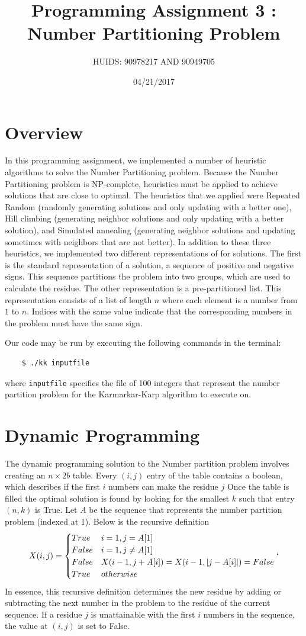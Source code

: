 \documentclass[a4paper]{article}
\title{Programming Assignment 3 : Number Partitioning Problem}
\author{HUIDS: 90978217 AND 90949705}
\date{04/21/2017}
\begin{document}
	
	\maketitle
	
	\section{Overview}
	In this programming assignment, we implemented a number of heuristic algorithms to solve the Number Partitioning problem. Because the Number Partitioning problem is NP-complete, heuristics must be applied to achieve solutions that are close to optimal. The heuristics that we applied were Repeated Random (randomly generating solutions and only updating with a better one), Hill climbing (generating neighbor solutions and only updating with a better solution), and Simulated annealing (generating neighbor solutions and updating sometimes with neighbors that are not better). In addition to these three heuristics, we implemented two different representations of for solutions. The first is the standard representation of a solution, a sequence of positive and negative signs. This sequence partitions the problem into two groups, which are used to calculate the residue. The other representation is a pre-partitioned list. This representation consists of a list of length $n$ where each element is a number from $1$ to $n$. Indices with the same value indicate that the corresponding numbers in the problem must have the same sign.
	
	Our code may be run by executing the following commands in the terminal:
	\begin{verbatim}
	$ ./kk inputfile
	\end{verbatim}
	where \texttt{inputfile} specifies the file of 100 integers that represent the number partition problem for the Karmarkar-Karp algorithm to execute on.
	
	\section{Dynamic Programming}
	The dynamic programming solution to the Number partition problem involves creating an $n \times 2b$ table. Every $(i,j)$ entry of the table contains a boolean, which describes if the first $i$ numbers can make the residue $j$  Once the table is filled the optimal solution is found by looking for the smallest $k$ such that entry $(n,k)$ is True. Let $A$ be the sequence that represents the number partition problem (indexed at 1). Below is the recursive definition
	\[X(i,j) = 
	\begin{cases}
	True & i = 1, j = A[1]\\
	False & i = 1, j \neq A[1] \\ 
	False & X(i-1, j + A[i]) = X(i-1, |j - A[i]|) = False \\
	True & otherwise
	\end{cases}`
	\]
	In essence, this recursive definition determines the new residue by adding or subtracting the next number in the problem to the residue of the current sequence. If a residue $j$ is unattainable with the first $i$ numbers in the sequence, the value at $(i,j)$ is set to False. 
	
\end{document}

